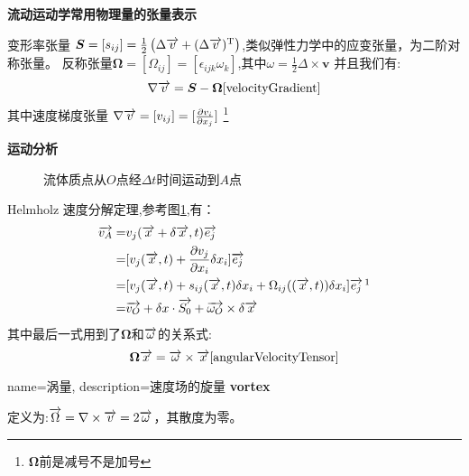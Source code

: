 \textbf{流动运动学常用物理量的张量表示}

变形率张量
$\bm{S}=[s_{ij}]=\frac{1}{2}\left(\Delta \overrightarrow{v}+(\Delta \overrightarrow{v})^{\mathrm{T}}\right)$,类似弹性力学中的应变张量，为二阶对称张量。
反称张量$\bm{\Omega}=[\Omega_{ij}]=[\epsilon_{ijk}\omega_k]$,其中$\omega=\frac{1}{2}\Delta \times \bm{v}$
并且我们有:
\begin{equation}\label{eq:w31AS}
\nabla \overrightarrow{v}=\bm{S}-\bm{\Omega}\cite{velocityGradient}
\end{equation}
其中速度梯度张量 $\nabla \overrightarrow{v}=[v_{ij}]=[\frac{\partial v_i}{\partial x_j}]$
\footnote{$\bm{\Omega}$前是减号不是加号}

\textbf{运动分析}

\begin{figure}[!ht]%
\centering

\caption{流体质点从$O$点经$\Delta t$时间运动到$A$点}\label{fig:311}
\end{figure}

Helmholz 速度分解定理,参考图\ref{fig:311},有：
\begin{align}
\v{v_{A}} = & v_j(\v{x}+\delta \v{x},t)\v{e_j}\\
=& [v_j(\v{x},t)+\frac{\partial v_j}{\partial x_i}\delta x_i]\v{e_j}\\
=& [v_j(\v{x},t)+s_{ij}(\v{x},t)\delta x_i+\Omega_{ij}((\v{x},t))\delta x_i]\v{e_j}\,\footnotemark\\
=& \v{v_O} + \delta x \cdot \v{S_0} + \v{\omega_O}\times \delta \v{x}
\end{align}
其中最后一式用到了$\bm{\Omega}$和$\overrightarrow{\omega}$的关系式:
\begin{equation}
\bm{\Omega} \overrightarrow{x}= \overrightarrow{\omega}\times \overrightarrow{x} \cite{angularVelocityTensor}
\end{equation}

{
  name=涡量,
  description={速度场的旋量}
}
\textbf{\gls{vortex}}

定义为:$\overrightarrow{\Omega}=\nabla \times \overrightarrow{v}=2\overrightarrow{\omega}$，其散度为零。

